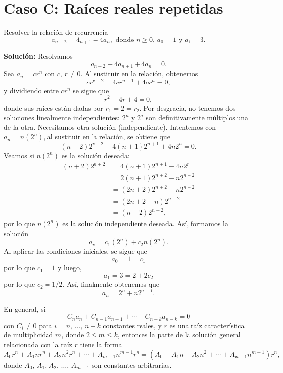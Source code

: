 \section*{Caso C: Raíces reales repetidas}

\begin{myexample}
    Resolver la relación de recurrencia
    $$a_{n+2} = 4_{n+1} - 4a_n, \text{ donde } n \geq 0, \, a_0 = 1 \text{ y } a_1 = 3.$$

    \tcblower
    \textbf{\color{jblueleft}Solución:} Resolvamos
    $$a_{n+2} - 4a_{n+1} + 4a_n = 0.$$
    Sea $a_n = cr^n$ con $c$, $r \neq 0$. Al sustituir en la relación, obtenemos
    $$cr^{n+2} - 4cr^{n+1} + 4cr^{n} = 0,$$
    y dividiendo entre $cr^{n}$ se sigue que
    $$r^2 - 4r + 4 = 0,$$
    donde sus raíces están dadas por $r_1 = 2 = r_2$. Por desgracia, no tenemos dos soluciones linealmente independientes: $2^n$ y $2^n$ son definitivamente múltiplos una de la otra. Necesitamos otra solución (independiente). Intentemos con $a_n = n(2^n)$, al sustituir en la relación, se obtiene que
    $$(n + 2)2^{n+2} - 4(n+1)2^{n+1} + 4n2^n = 0.$$
    Veamos si $n(2^n)$ es la solución deseada:
    \begin{align*}
        (n + 2)2^{n+2} & = 4(n+1)2^{n+1} - 4n2^n \\
        & = 2(n + 1)2^{n + 2} - n 2^{n+2} \\
        & = (2n+2)2^{n+2} - n2^{n+2} \\
        & = (2n + 2 - n)2^{n+2} \\
        & = (n + 2)2^{n+2},
    \end{align*}
    por lo que $n(2^n)$ es la solución independiente deseada. Así, formamos la solución
    $$a_n = c_1 (2^n) + c_2 n(2^n).$$
    Al aplicar las condiciones iniciales, se sigue que
    $$a_0 = 1 = c_1$$
    por lo que $c_1 = 1$ y luego,
    $$a_1 = 3 = 2 + 2c_2$$
    por lo que $c_2 = 1/2$. Así, finalmente obtenemos que
    $$a_n = 2^n + n2^{n-1}.$$
\end{myexample}

\begin{BOX}
    En general, si
    $$C_na_n + C_{n-1}a_{n-1} + \cdots + C_{n-k}a_{n-k} = 0$$
    con $C_i \neq 0$ para $i = n, \, \dots, \, n-k$ constantes reales, y $r$ es una raíz característica de multiplicidad $m$, donde $2 \leq m \leq k$, entonces la parte de la solución general relacionada con la raíz $r$ tiene la forma
    $$A_0r^n + A_1nr^n + A_2n^2r^n + \cdots + A_{m-1}n^{m-1}r^n = \left( A_0 + A_1n + A_2n^2 + \cdots + A_{m-1}n^{m-1} \right)r^n,$$
    donde $A_0$, $A_1$, $A_2$, $\dots$, $A_{m-1}$ son constantes arbitrarias.
\end{BOX}

